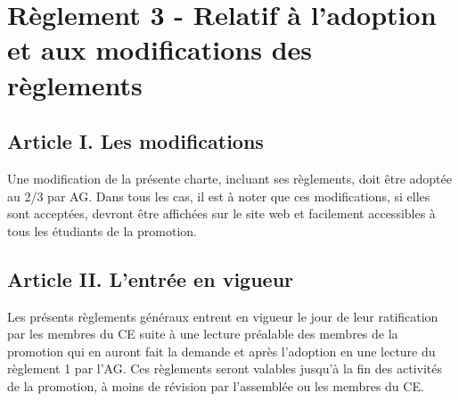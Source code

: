 \section*{Règlement 3 - Relatif à l'adoption et aux modifications des règlements} 


\subsection*{Article I. Les modifications}
Une modification de la présente charte, incluant ses règlements, doit être adoptée au 2/3 par AG. Dans tous les cas, il est à noter que ces modifications, si elles sont acceptées, devront être affichées sur le site web et facilement accessibles à tous les étudiants de la promotion. 

\subsection*{Article II. L'entrée en vigueur}
Les présents règlements généraux entrent en vigueur le jour de leur ratification par les membres du CE suite à une lecture préalable des membres de la promotion qui en auront fait la demande et après l'adoption en une lecture du règlement 1 par l'AG. Ces règlements seront valables jusqu’à la fin des activités de la promotion, à moins de révision par l’assemblée ou les membres du CE. 

